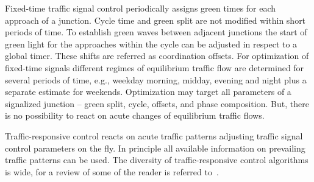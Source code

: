 Fixed-time traffic signal control periodically assigns green times for each approach of a junction. 
Cycle time and green split are not modified within short periods of time. 
To establish green waves between adjacent junctions the start of green light for the approaches within the cycle can be adjusted in respect to a global timer. 
These shifts are referred as coordination offsets. 
For optimization of fixed-time signals different regimes of equilibrium traffic flow are determined for several periods of time, e.g., weekday morning, midday, evening and night plus a separate estimate for weekends.   
Optimization may target all parameters of a signalized junction -- green split, cycle, offsets, and phase composition. 
But, there is no possibility to react on acute changes of equilibrium traffic flows. 

Traffic-responsive control reacts on acute traffic patterns adjusting traffic signal control parameters on the fly. 
In principle all available information on prevailing traffic patterns can be used. 
The diversity of traffic-responsive control algorithms is wide, for a review of some of the reader is referred to~\citet[][]{Grether2014PhD}. 

